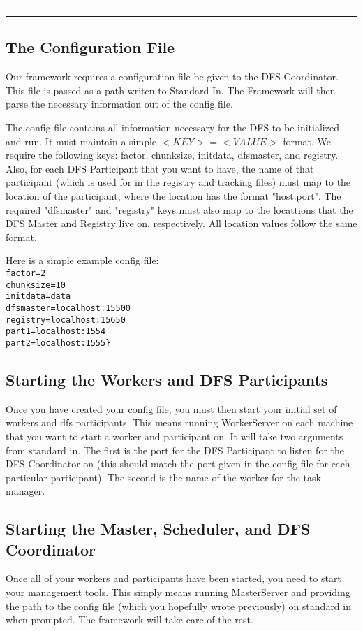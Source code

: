 \documentclass[11pt]{article}
\newcounter{questionCounter}
\newcounter{partCounter}[questionCounter]
\newenvironment{question}[2][\arabic{questionCounter}]{%
    \setcounter{partCounter}{0}%
    \vspace{.25in} \hrule \vspace{0.5em}%
        \noindent{\bf #2}%
    \vspace{0.8em} \hrule \vspace{.10in}%
    \addtocounter{questionCounter}{1}%
}{}
\begin{document}
\begin{question}{Section 2 - Administration and Configuration}
\subsection*{The Configuration File}
Our framework requires a configuration file be given to the DFS Coordinator. This file is passed as a path writen to Standard In. The Framework will then parse the necessary information out of the config file.

The config file contains all information necessary for the DFS to be initialized and run. It must maintain a simple $<KEY>=<VALUE>$ format. We require the following keys: factor, chunksize, initdata, dfsmaster, and registry. Also, for each DFS Participant that you want to have, the name of that participant (which is used for in the registry and tracking files) must map to the location of the participant, where the location has the format "host:port". The required "dfsmaster" and "registry" keys must also map to the locattions that the DFS Master and Registry live on, respectively. All location values follow the same format.

Here is a simple example config file:\\
\verb$factor=2$\\
\verb$chunksize=10$\\
\verb$initdata=data$\\
\verb$dfsmaster=localhost:15500$\\
\verb$registry=localhost:15650$\\
\verb$part1=localhost:1554$\\
\verb$part2=localhost:1555}$\\

\subsection*{Starting the Workers and DFS Participants}
Once you have created your config file, you must then start your initial set of workers and dfs participants. This means running WorkerServer on each machine that you want to start a worker and participant on. It will take two arguments from standard in. The first is the port for the DFS Participant to listen for the DFS Coordinator on (this should match the port given in the config file for each particular participant). The second is the name of the worker for the task manager.

\subsection*{Starting the Master, Scheduler, and DFS Coordinator}
Once all of your workers and participants have been started, you need to start your management tools. This simply means running MasterServer and providing the path to the config file (which you hopefully wrote previously) on standard in when prompted. The framework will take care of the rest.


\end{question}
\end{document}
